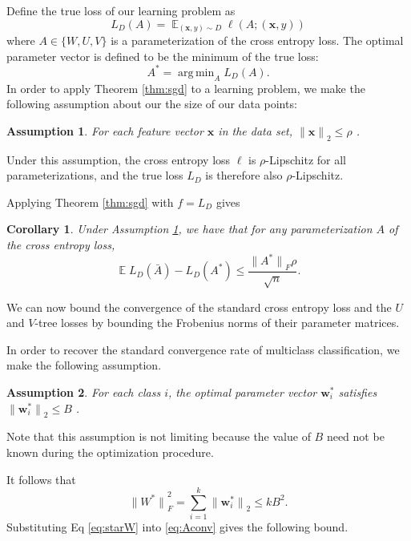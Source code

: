 \documentclass[twoside]{article}
\newtheorem{assumption}{Assumption}
\newtheorem{corollary}{Corollary}
\DeclareMathOperator{\E}{\mathbb E}
\DeclareMathOperator*{\argmin}{arg\,min}
\renewcommand{\star}[1]{{#1}^{*}}
\newcommand{\w}{\mathbf w}
\newcommand{\x}{\mathbf x}
\newcommand{\ltwo}[1]{{\lVert {#1} \rVert}_2}
\newcommand{\lF}[1]{{\lVert {#1} \rVert}_F}
\begin{document}
Define the true loss of our learning problem as
\begin{equation}
    L_D(A) = \E_{(\x,y)\sim D} \ell(A; (\x, y))
\end{equation}
where $A \in \{W, U, V\}$ is a parameterization of the cross entropy loss.
The optimal parameter vector is defined to be the minimum of the true loss:
\begin{equation}
    \star A = \argmin_{A} L_D(A).
\end{equation}
In order to apply Theorem \ref{thm:sgd} to a learning problem,
we make the following assumption about our the size of our data points:
\begin{assumption}
    \label{ass:lip}
    For each feature vector $\x$ in the data set, 
        $\ltwo{\x} \le \rho$
        .
\end{assumption}
Under this assumption, the cross entropy loss $\ell$ is $\rho$-Lipschitz for all parameterizations,
and the true loss $L_D$ is therefore also $\rho$-Lipschitz.

Applying Theorem \ref{thm:sgd} with $f=L_D$ gives
\begin{corollary}
    \label{ref:cor:A}
    Under Assumption \ref{ass:lip}, we have that for any parameterization $A$ of the cross entropy loss,
    \begin{equation}
        \E L_D(\bar A) - L_D(\star A) \le \frac{\lF{\star A}\rho}{\sqrt n}.
        \label{eq:Aconv}
    \end{equation}
\end{corollary}

We can now bound the convergence of the standard cross entropy loss and the $U$ and $V$-tree losses by bounding the Frobenius norms of their parameter matrices.

In order to recover the standard convergence rate of multiclass classification, we make the following assumption.
\begin{assumption}
    \label{ass:B}
    For each class $i$, the optimal parameter vector $\star\w_i$ satisfies
        $\ltwo{\star\w_i} \le B$
        .
\end{assumption}
Note that this assumption is not limiting because the value of $B$ need not be known during the optimization procedure.

It follows that
\begin{equation}
    \lF{\star W}^2 = \sum_{i=1}^k \ltwo{\star\w_i} \le kB^2.
    \label{eq:starW}
\end{equation}
Substituting Eq \eqref{eq:starW} into \eqref{eq:Aconv} gives the following bound.
\end{document}
